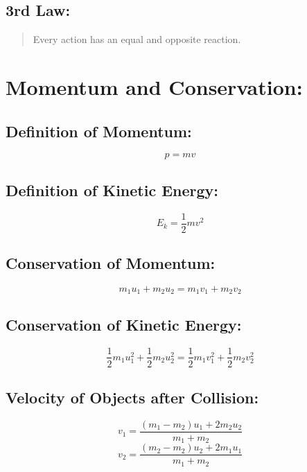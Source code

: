 \documentclass[a4paper]{report}
\begin{document}
        \subsection{3rd Law: }
            \begin{quotation}
                \item Every action has an equal and opposite reaction.
            \end{quotation}
    
    \section{Momentum and Conservation: }
        \subsection{Definition of Momentum: }
            \begin{equation}
                p = mv
            \end{equation}
        \subsection{Definition of Kinetic Energy: }
            \begin{equation}
                E_k = \frac{1}{2}m v^2
            \end{equation}
        \subsection{Conservation of Momentum: }
            \begin{equation}
                m_1 u_1 + m_2 u_2 = m_1 v_1 + m_2 v_2
            \end{equation}
        \subsection{Conservation of Kinetic Energy: }
            \begin{equation}
                \frac{1}{2} m_1 u_1^2 + \frac{1}{2} m_2 u_2^2 = \frac{1}{2} m_1 v_1^2 + \frac{1}{2} m_2 v_2^2
            \end{equation}
        \subsection{Velocity of Objects after Collision: }
            \begin{equation}
                v_1 = \frac{(m_1 - m_2)u_1 + 2 m_2 u_2}{m_1 + m_2}
            \end{equation}
            \begin{equation}
                v_2 = \frac{(m_2 - m_2)u_2 + 2 m_1 u_1}{m_1 + m_2}
            \end{equation}
\end{document}

